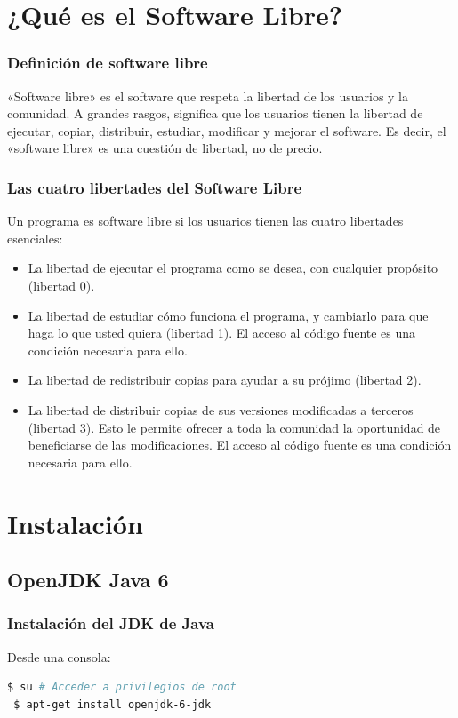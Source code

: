 \documentclass{beamer}
\begin{document}
\section{¿Qué es el Software Libre?}
\begin{frame}
\frametitle{Definición de software libre}
«Software libre» es el software que respeta la libertad de los usuarios y la comunidad. A grandes rasgos, significa que los usuarios tienen la libertad de ejecutar, copiar, distribuir, estudiar, modificar y mejorar el software. Es decir, el «software libre» es una cuestión de libertad, no de precio.

\end{frame}
\begin{frame}
\frametitle{Las cuatro libertades del Software Libre}
Un programa es software libre si los usuarios tienen las cuatro libertades esenciales:
\begin{itemize}
\item La libertad de ejecutar el programa como se desea, con cualquier propósito (libertad 0).
\item La libertad de estudiar cómo funciona el programa, y cambiarlo para que haga lo que usted quiera (libertad 1). El acceso al código fuente es una condición necesaria para ello.
\item La libertad de redistribuir copias para ayudar a su prójimo (libertad 2).
\item La libertad de distribuir copias de sus versiones modificadas a terceros (libertad 3). Esto le permite ofrecer a toda la comunidad la oportunidad de beneficiarse de las modificaciones. El acceso al código fuente es una condición necesaria para ello.
\end{itemize}
\end{frame}

\section{Instalación} %


\begin{frame}[fragile]
\subsection{OpenJDK Java 6 } %

\frametitle{Instalación del JDK de Java}

\noindent Desde una consola:
\begin{lstlisting}[language=bash]
 $ su # Acceder a privilegios de root
 $ apt-get install openjdk-6-jdk
\end{lstlisting}


\end{frame}
\end{document}
